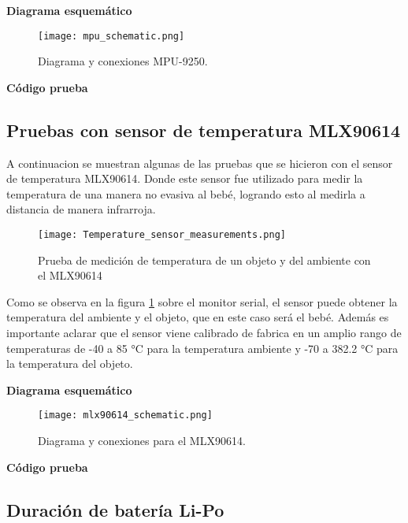 \textbf{Diagrama esquemático}
\begin{figure}[htp!]
    \centering
    \texttt{[image: mpu\_schematic.png]}
    \caption{Diagrama y conexiones MPU-9250.}
\end{figure}
\FloatBarrier
\textbf{Código prueba}

\lstset{style=mystyle}



\subsection{Pruebas con sensor de temperatura MLX90614}

A continuacion se muestran algunas de las pruebas que se hicieron con el sensor de temperatura MLX90614.
Donde este sensor fue utilizado para medir la temperatura de una manera no evasiva al bebé, logrando esto
al medirla a distancia de manera infrarroja.

\begin{figure}[htp!]
    \centering
    \texttt{[image: Temperature\_sensor\_measurements.png]}
    \caption{Prueba de medición de temperatura de un objeto y del ambiente con el MLX90614}
    \label{fig: temperature_measurements}
\end{figure}
\FloatBarrier

Como se observa en la figura \ref{fig: temperature_measurements} sobre el monitor serial, el sensor puede obtener la temperatura del
ambiente y el objeto, que en este caso será el bebé. Además es importante aclarar que el sensor viene calibrado de fabrica en un amplio rango de temperaturas de
-40 a 85 °C para la temperatura ambiente y -70 a 382.2 °C para la temperatura del objeto.\newline

\textbf{Diagrama esquemático}
\begin{figure}[htp!]
    \centering
    \texttt{[image: mlx90614\_schematic.png]}
    \caption{Diagrama y conexiones para el MLX90614.}
\end{figure}
\FloatBarrier
\textbf{Código prueba}

\lstset{style=mystyle}



\subsection{Duración de batería Li-Po}

